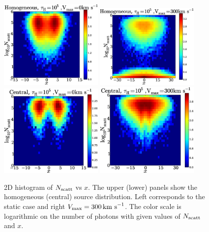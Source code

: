 \documentclass{emulateapj}
\newcommand{\kms}{{\ifmmode{{\mathrm{\,km\ s}^{-1}}}\else{\,km~s$^{-1}$}\fi}}
\begin{document}
\begin{figure}
\begin{center}
  \includegraphics[width=0.45\textwidth]{f5_1.eps}
  \includegraphics[width=0.45\textwidth]{f5_2.eps}
  \includegraphics[width=0.45\textwidth]{f5_3.eps}
  \includegraphics[width=0.45\textwidth]{f5_4.eps}    
\end{center}
    \caption{2D histogram of $N_{\rm scatt}$ vs $x$. The upper (lower) panels
      show the homogeneous (central) source distribution. Left
      corresponds to the static case and right
      $V_{\rm max}=300\kms$. The color scale is logarithmic on the
      number of photons with given values of $N_{\rm scatt}$ and
      $x$. \label{fig:Nscatt2D}}   
\end{figure}
\end{document}
